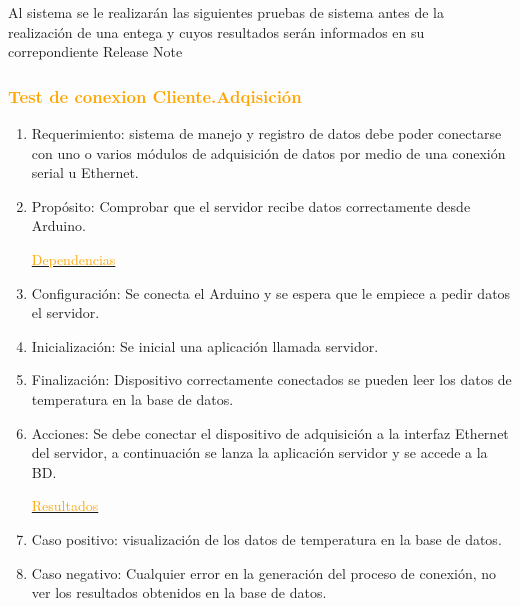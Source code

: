 Al sistema se le realizarán las siguientes pruebas de sistema antes de la realización de una entega y cuyos resultados serán informados en su correpondiente Release Note


 \subsubsection{\textcolor{orange}{Test de conexion Cliente.Adqisición }}

\begin{enumerate}
\item Requerimiento: sistema de manejo y registro de datos debe poder conectarse con uno o varios módulos de adquisición de datos por medio de una conexión serial u Ethernet.
\item Propósito: Comprobar que el servidor recibe datos correctamente desde Arduino.
 
\underline{\textcolor{orange}{Dependencias}}

\item Configuración: Se conecta el Arduino y se espera que le empiece a pedir datos el servidor.
\item Inicialización: Se inicial una aplicación llamada servidor.
\item Finalización: Dispositivo correctamente conectados se pueden leer los datos de temperatura en la base de datos.   
\item Acciones: Se debe conectar el dispositivo de adquisición a la interfaz Ethernet del servidor, a continuación se lanza la aplicación servidor y se accede a la BD.

\underline{\textcolor{orange}{Resultados}} 

\item Caso positivo: visualización de los datos de temperatura en la base de datos.
\item Caso negativo: Cualquier error en la generación del proceso de conexión, no ver los resultados obtenidos en la base de datos.

\end{enumerate}


